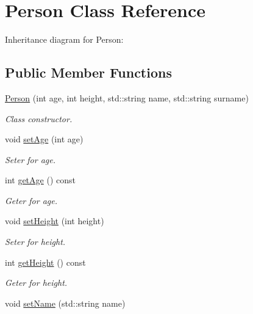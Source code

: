 \hypertarget{classPerson}{}\section{Person Class Reference}
\label{classPerson}


Inheritance diagram for Person\+:
\subsection*{Public Member Functions}
\begin{DoxyCompactItemize}
\item 
\hyperlink{classPerson_a94cbaf28f1005052a5136a8f9c88aecd}{Person} (int age, int height, std\+::string name, std\+::string surname)
\begin{DoxyCompactList}\small\item\em Class constructor. \end{DoxyCompactList}\item 
void \hyperlink{classPerson_ac8ade54c27a0657c987c395ff04a9d46}{set\+Age} (int age)
\begin{DoxyCompactList}\small\item\em Seter for age. \end{DoxyCompactList}\item 
\mbox{\label{classPerson_a4b66dbee570398920b8fb6aacddd2559}} 
int \hyperlink{classPerson_a4b66dbee570398920b8fb6aacddd2559}{get\+Age} () const
\begin{DoxyCompactList}\small\item\em Geter for age. \end{DoxyCompactList}\item 
void \hyperlink{classPerson_a93800494846b0955102ce75ff3d1da13}{set\+Height} (int height)
\begin{DoxyCompactList}\small\item\em Seter for height. \end{DoxyCompactList}\item 
\mbox{\label{classPerson_a9ecf449a118985ac470b554f7131b408}} 
int \hyperlink{classPerson_a9ecf449a118985ac470b554f7131b408}{get\+Height} () const
\begin{DoxyCompactList}\small\item\em Geter for height. \end{DoxyCompactList}\item 
void \hyperlink{classPerson_ad6e438f456d3ae6f5b477931c0a6aeba}{set\+Name} (std\+::string name)

\end{DoxyCompactItemize}
